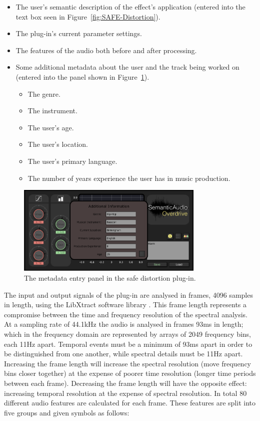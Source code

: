 		\begin{itemize}
			\item The user's semantic description of the effect's application (entered into the text box seen
				in Figure~\ref{fig:SAFE-Distortion}).
			\item The plug-in's current parameter settings.
			\item The features of the audio both before and after processing.
			\item Some additional metadata about the user and the track being worked on (entered into the panel
				shown in Figure~\ref{fig:SAFE-Metadata}).
			\begin{itemize}
				\item The genre.
				\item The instrument.
				\item The user's age.
				\item The user's location.
				\item The user's primary language.
				\item The number of years experience the user has in music production.
			\end{itemize}
		\end{itemize}

		\begin{figure}[h!]
			\centering
			\includegraphics[width=0.8\textwidth]{chapter4/Images/SAFEMetadata.png}
			\caption{The metadata entry panel in the \acrshort{safe} distortion plug-in.}
			\label{fig:SAFE-Metadata}
		\end{figure}

		The input and output signals of the plug-in are analysed in frames, 4096 samples in length, using the
		LibXtract software library \citep{bullock2007libxtract}. This frame length represents a compromise between
		the time and frequency resolution of the spectral analysis. At a sampling rate of 44.1kHz the audio is
		analysed in frames 93ms in length; which in the frequency domain are represented by arrays of 2049
		frequency bins, each 11Hz apart. Temporal events must be a minimum of 93ms apart in order to be
		distinguished from one another, while spectral details must be 11Hz apart. Increasing the frame length will
		increase the spectral resolution (move frequency bins closer together) at the expense of poorer time
		resolution (longer time periods between each frame).  Decreasing the frame length will have the opposite
		effect: increasing temporal resolution at the expense of spectral resolution. In total 80 different audio
		features are calculated for each frame. These features are split into five groups and given symbols as
		follows:

